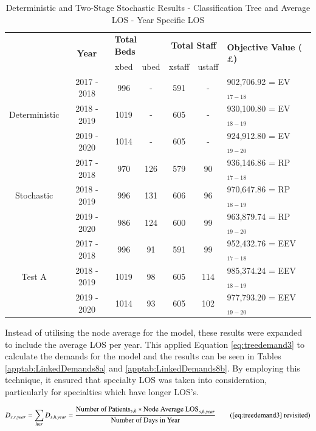 \documentclass[../thesis.tex]{subfiles}
\begin{document}
\begin{table}[h!]
    \centering
    \begin{tabular}{ccccccl}\toprule
 & \multirow{2}{*}{\textbf{Year}}& \multicolumn{2}{l}{\textbf{Total Beds}} & \multicolumn{2}{c}{\textbf{Total Staff}} & \multirow{2}{*}{\textbf{Objective Value ($\pounds$)}}\\ \cmidrule(lr){3-4} \cmidrule(lr){5-6}
&& xbed           & ubed          & xstaff         & ustaff         \\ \midrule
     \multirow{3}{*}{Deterministic} & 2017 - 2018 & 996  & - & 591 & - & 902,706.92 =  EV$_{17-18}$ \\ 
      & 2018 - 2019 & 1019 & - &  605 & - & 930,100.80  =  EV$_{18-19}$ \\
      & 2019 - 2020 & 1014  & - & 605 & - & 924,912.80  =  EV$_{19-20}$\\ \midrule
     \multirow{3}{*}{Stochastic} & 2017 - 2018 & 970 & 126 &579  & 90 &  936,146.86
 =  RP$_{17-18}$ \\ 
      & 2018 - 2019 & 996  &  131 & 606 & 96 & 970,647.86 = RP$_{18-19}$ \\
      & 2019 - 2020 & 986 & 124 & 600 & 99 & 963,879.74 = RP$_{19-20}$\\ \midrule    
     \multirow{3}{*}{Test A} & 2017 - 2018 & 996 & 91 & 591  &99  & 952,432.76
 = EEV$_{17-18}$ \\ 
      & 2018 - 2019& 1019 & 98 & 605  & 114 & 985,374.24 = EEV$_{18-19}$ \\
      & 2019 - 2020 & 1014 &  93 & 605 & 102 &  977,793.20 = EEV$_{19-20}$\\ \bottomrule       
    \end{tabular}
    \caption{Deterministic and Two-Stage Stochastic Results - Classification Tree and Average LOS - Year Specific LOS}
    \label{tab:Results7}
\end{table}

Instead of utilising the node average for the model, these results were expanded to include the average LOS per year. This applied Equation \eqref{eq:treedemand3} to calculate the demands for the model and the results can be seen in Tables \ref{apptab:LinkedDemands8a} and \ref{apptab:LinkedDemands8b}. By employing this technique, it ensured that specialty LOS was taken into consideration, particularly for specialties which have longer LOS's.

\begin{equation}
        D_{s,r,year} = \sum\limits_{h \in r} D_{s,h,year} = \frac{\text{Number of Patients}_{s,h}*\text{Node Average LOS}_{s,h,year}}{\text{Number of Days in Year}} \tag{\ref{eq:treedemand3} revisited}
\end{equation}
\end{document}
